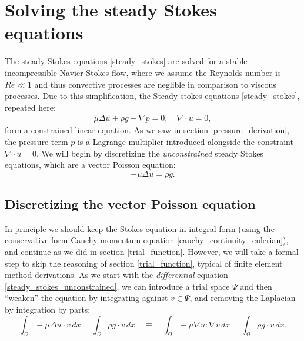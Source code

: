 \documentclass[11pt,a4paper]{memoir}
\begin{document}
\section{Solving the steady Stokes equations}
The steady Stokes equations \eqref{steady_stokes} are solved for a stable incompressible Navier-Stokes flow,
where we assume the Reynolds number is $Re \ll 1$ and thus convective processes are neglible in comparison to viscous processes.
Due to this simplification, the Steady stokes equations \eqref{steady_stokes}, repeated here:
\begin{align*}
    \mu\Delta u + \rho g - \nabla p = 0,\quad \nabla\cdot u = 0,
\end{align*}
form a constrained linear equation. As we saw in section \ref{pressure_derivation}, the pressure term $p$ is a Lagrange multiplier introduced
alongside the constraint $\nabla\cdot u = 0$. We will begin by discretizing the \textit{unconstrained} steady Stokes equations,
which are a vector Poisson equation:
\begin{equation}\label{steady_stokes_unconstrained}
    -\mu\Delta u = \rho g.
\end{equation}

\subsection{Discretizing the vector Poisson equation}\label{discretizing_vector_poisson}
In principle we should keep the Stokes equation
in integral form (using the conservative-form Cauchy momentum equation \eqref{cauchy_continuity_eulerian}), and continue as we did
in section \ref{trial_function}. However,
we will take a formal step to skip the reasoning of section \ref{trial_function}, typical of finite element method derivations.
As we start with the \textit{differential} equation \eqref{steady_stokes_unconstrained}, we can introduce a trial space $\Psi$ and then ``weaken''
the equation by integrating against $v \in \Psi$, and removing the Laplacian by integration by parts:
\begin{equation}\label{steady_stokes_unconstrained_weak}
    \int_\Omega -\mu\Delta u\cdot v\,dx = \int_\Omega \rho g\cdot v\,dx
    \quad\equiv\quad
    \int_\Omega -\mu\nabla u : \nabla v\,dx = \int_\Omega \rho g\cdot v\,dx.
\end{equation}
\end{document}

